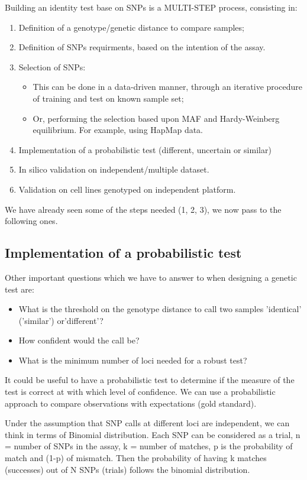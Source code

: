 Building an identity test base on SNPs is a MULTI-STEP process, consisting in: 
\begin{enumerate}
	\item Definition of a genotype/genetic distance to compare samples;
	\item Definition of SNPs requirments, based on the intention of the assay.
	\item Selection of SNPs:
	\begin{itemize}
		\item This can be done in a data-driven manner, through an iterative
		procedure of training and test on known sample set;
		\item Or, performing the selection based upon MAF and Hardy-Weinberg
		equilibrium. For example, using HapMap data.
	\end{itemize}
	\item Implementation of a probabilistic test (different, uncertain or
	similar)
	\item In silico validation on independent/multiple dataset.
	\item Validation on cell lines genotyped on independent platform. 
\end{enumerate}
We have already seen some of the steps needed (1, 2, 3), we now pass to the
following ones.


\subsection{Implementation of a probabilistic test} 

Other important questions which we have to answer to when designing a genetic
test are:
\begin{itemize}
	\item What is the threshold on the genotype distance to call two samples
	'identical' ('similar') or'different'?
	\item How confident would the call be?
    \item What is the minimum number of loci needed for a robust test?
\end{itemize}

It could be useful to have a probabilistic test to determine if the measure of
the test is correct at with which level of confidence. We can use a
probabilistic approach to compare observations with expectations (gold
standard).

\bigskip
Under the assumption that SNP calls at different loci are independent, we can
think in terms of Binomial distribution. Each SNP can be considered as a trial,
n = number of SNPs in the assay, k = number of matches, p is the probability of
match and (1-p) of mismatch. Then the probability of having k matches
(successes) out of N SNPs (trials) follows the binomial distribution.

